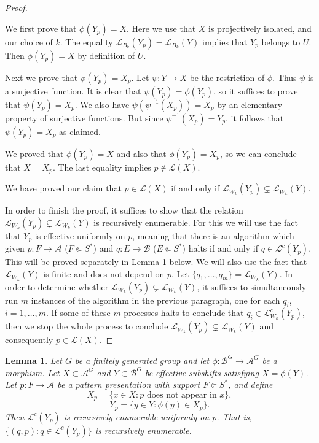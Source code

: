 \documentclass[a4paper,oneside]{amsart}
\renewcommand{\(}{\begin{dmath*}}
\renewcommand{\)}{\end{dmath*}}
\newtheorem{lemma}[theorem]{Lemma}
\theoremstyle{definition}
\newcommand{\Le}{\mathcal{L}}
\newcommand{\Lep}{\mathscr{L}}
\newcommand{\A}{\mathcal{A}}
\newcommand{\B}{\mathcal{B}}
\begin{document}
\begin{proof}
\begin{itemize}
        We first prove that $\phi(Y_p)=X$. Here we use that $X$ is projectively isolated, and our choice of $k$. The equality $\Le_{B_k}(Y_p)=\Le_{B_k}(Y)$ implies that $Y_p$ belongs to $U$. Then $\phi(Y_p)=X$ by definition of $U$. 
        
        Next we prove that $\phi(Y_p)=X_p$. Let $\psi\colon Y\to X$ be the restriction of $\phi$. Thus $\psi$ is a surjective function. It is clear that $\psi(Y_p)=\phi(Y_p)$, so it suffices to prove that $\psi(Y_p)=X_p$. We also have $\psi(\psi^{-1}(X_p))=X_p$ by an elementary property of surjective functions. But since $\psi^{-1}(X_p)=Y_p$, it follows that $\psi(Y_p)=X_p$ as claimed.   
        
        We proved that $\phi(Y_p)=X$ and also that $\phi(Y_p)=X_p$, so we can conclude that $X=X_p$. The last equality implies $p\not\in\Lep(X)$.
    \end{itemize} 
    We have proved our claim that $p\in\Lep(X)$ if and only if $\Lep_{W_k}(Y_p)\subsetneq\Lep_{W_k}(Y)$.
    
    In order to finish the proof, it suffices to show that the relation $\Lep_{W_k}(Y_p)\subsetneq\Lep_{W_k}(Y)$ is recursively enumerable. For this we will use the fact that $Y_p$ is effective uniformly on $p$, meaning that there is an algorithm which given $p\colon F\to \A$ ($F\Subset S^\ast$) and $q\colon E\to \B$ ($E\Subset S^\ast$) halts if and only if $q\in \Lep^c(Y_p)$. This will be proved separately in Lemma \ref{lemma} below. We will also use the fact that $\Lep_{W_k}(Y)$ is finite and does not depend on $p$. Let $\{q_1,\dots,q_m\}=\Lep_{W_k}(Y)$. In order to determine whether $\Lep_{W_k}(Y_p)\subsetneq\Lep_{W_k}(Y)$, it suffices to simultaneously run $m$ instances of the algorithm in the previous paragraph, one for each $q_i$, $i=1,\dots,m$. If some of these $m$ processes halts to conclude that $q_i\in\Lep^c_{W_k}(Y_p)$, then we stop the whole process to conclude $\Lep_{W_k}(Y_p)\subsetneq\Lep_{W_k}(Y)$ and consequently $p\in\Lep(X)$. \end{proof}
\begin{lemma}\label{lemma}
    Let $G$ be a finitely generated group and let $\phi\colon \B^G\to \A^G$ be a morphism. Let $X\subset\A^G$ and  $Y\subset \B^G$ be effective subshifts satisfying $X=\phi(Y)$. Let $p\colon F\to \A$ be a pattern presentation with support $F\Subset S^\ast$, and define
    \[X_p=\{x\in X : \text{$p$ does not appear in $x$}\},\] 
    \[Y_p=\{y \in Y : \phi(y)\in X_p\}.\]
    Then $\Lep^c(Y_p)$ is recursively enumerable uniformly on $p$. That is, $\{(q,p) : q\in \Lep^c(Y_p)\}$ is recursively enumerable.  
\end{lemma}
\end{document}

